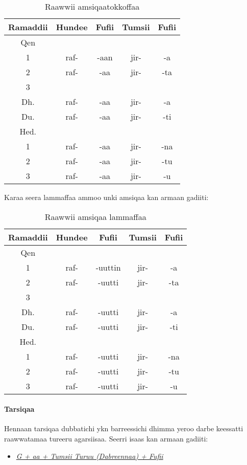 \documentclass[11pt,b5paper]{book}
\begin{document}
\begin{table}[H]
	\centering
	\caption{Raawwii amsiqaatokkoffaa}
	\begin{tabular}{ccccc}
		\hline\hline
		Ramaddii & Hundee & Fufii & Tumsii & Fufii \\
		\hline
		Qen &  &  &  &  \\
		1	& raf- & -aan & jir- & -a		\\
		2	& raf- & -aa & jir- & -ta	\\
		3 \\
		Dh.	& raf- & -aa & jir- & -a		\\
		Du.	& raf- & -aa & jir- & -ti		\\
		\hline
		Hed. \\
		1   & raf- & -aa & jir- & -na    \\
		2   & raf- & -aa & jir- & -tu      \\
		3   & raf- & -aa & jir- & -u      \\
		\hline
		
	\end{tabular}
\end{table}

Karaa seera lammaffaa ammoo unki amsiqaa kan armaan gadiiti: 
\begin{table}[H]
	\centering
	\caption{Raawwii amsiqaa lammaffaa}
	\begin{tabular}{ccccc}
		\hline\hline
		Ramaddii & Hundee & Fufii & Tumsii & Fufii \\
		\hline
		Qen &  &  &  &  \\
		1	& raf- & -uuttin & jir- & -a		\\
		2	& raf- & -uutti & jir- & -ta	\\
		3 \\
		Dh.	& raf- & -uutti & jir- & -a		\\
		Du.	& raf- & -uutti & jir- & -ti		\\
		\hline
		Hed. \\
		1   & raf- & -uutti & jir- & -na    \\
		2   & raf- & -uutti & jir- & -tu      \\
		3   & raf- & -uutti & jir- & -u      \\
		\hline
		
	\end{tabular}
\end{table}

\paragraph{Tarsiqaa}
Hennaan tarsiqaa dubbatichi ykn barreessichi dhimma yeroo darbe keessatti raawwatamaa tureeru agarsiisaa. Seerri isaas kan armaan gadiiti: 
\begin{itemize}
	\item \textit{\underline{G + aa + Tumsii Turuu (Dabreennaa) + Fufii }}
\end{itemize}
\end{document}
